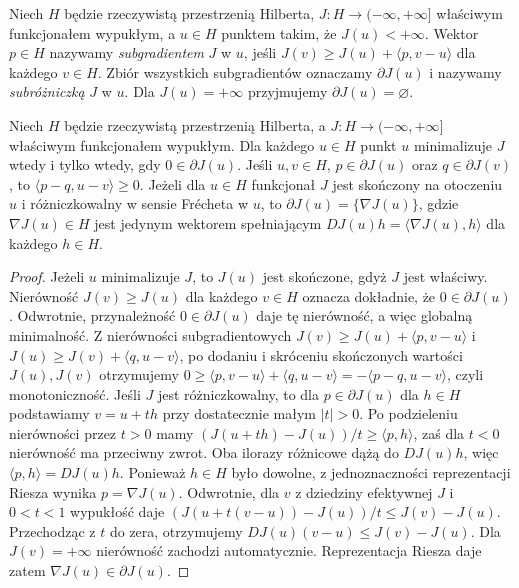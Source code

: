 \begin{definicja}
\label{def:subgrad16}
Niech $H$ będzie rzeczywistą przestrzenią Hilberta,
$J:H\to(-\infty,+\infty]$ właściwym funkcjonałem wypukłym,
a $u\in H$ punktem takim,
że $J(u)<+\infty$. Wektor $p\in H$ nazywamy
\emph{subgradientem} $J$ w $u$, jeśli
$J(v)\ge J(u)+\langle p,v-u\rangle$ dla każdego $v\in H$.
Zbiór wszystkich subgradientów oznaczamy $\partial J(u)$
i nazywamy \emph{subróżniczką} $J$ w $u$.
Dla $J(u)=+\infty$ przyjmujemy $\partial J(u)=\varnothing$.
\end{definicja}

\begin{stwierdzenie}
\label{prop:subgrad16}
Niech $H$ będzie rzeczywistą przestrzenią Hilberta,
a $J:H\to(-\infty,+\infty]$ właściwym funkcjonałem wypukłym.
Dla każdego $u\in H$ punkt $u$ minimalizuje $J$ wtedy
i tylko wtedy, gdy $0\in\partial J(u)$. Jeśli $u,v\in H$,
$p\in\partial J(u)$ oraz $q\in\partial J(v)$, to
$\langle p-q,u-v\rangle\ge0$.
Jeżeli dla $u\in H$ funkcjonał $J$ jest skończony
na otoczeniu $u$ i różniczkowalny w sensie Frécheta w $u$,
to $\partial J(u)=\{\nabla J(u)\}$, gdzie $\nabla J(u)\in H$
jest jedynym wektorem spełniającym
$DJ(u)h=\langle\nabla J(u),h\rangle$ dla każdego $h\in H$.
\end{stwierdzenie}
\begin{proof}
Jeżeli $u$ minimalizuje $J$, to $J(u)$ jest skończone,
gdyż $J$ jest właściwy. Nierówność $J(v)\ge J(u)$
dla każdego $v\in H$ oznacza dokładnie, że $0\in\partial J(u)$.
Odwrotnie, przynależność $0\in\partial J(u)$ daje tę
nierówność, a więc globalną minimalność.
Z nierówności subgradientowych
$J(v)\ge J(u)+\langle p,v-u\rangle$ i
$J(u)\ge J(v)+\langle q,u-v\rangle$,
po dodaniu i skróceniu skończonych wartości $J(u),J(v)$
otrzymujemy $0\ge\langle p,v-u\rangle+\langle q,u-v\rangle
=-\langle p-q,u-v\rangle$, czyli monotoniczność.
Jeśli $J$ jest różniczkowalny, to dla $p\in\partial J(u)$
dla $h\in H$ podstawiamy $v=u+th$ przy dostatecznie małym
$|t|>0$. Po podzieleniu nierówności przez $t>0$ mamy
$(J(u+th)-J(u))/t\ge\langle p,h\rangle$, zaś dla $t<0$
nierówność ma przeciwny zwrot. Oba ilorazy różnicowe
dążą do $DJ(u)h$, więc $\langle p,h\rangle=DJ(u)h$.
Ponieważ $h\in H$ było dowolne, z jednoznaczności
reprezentacji Riesza wynika $p=\nabla J(u)$.
Odwrotnie, dla $v$ z dziedziny efektywnej $J$ i $0<t<1$
wypukłość daje
$(J(u+t(v-u))-J(u))/t\le J(v)-J(u)$.
Przechodząc z $t$ do zera, otrzymujemy
$DJ(u)(v-u)\le J(v)-J(u)$.
Dla $J(v)=+\infty$ nierówność zachodzi automatycznie.
Reprezentacja Riesza daje zatem $\nabla J(u)\in\partial J(u)$.
\end{proof}

